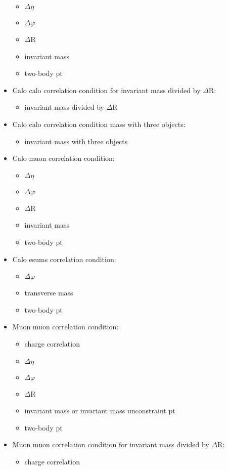 \begin{itemize}
\begin{itemize}
\item $\Delta\eta$
\item $\Delta\varphi$
\item $\Delta$R
\item invariant mass
\item two-body pt
\end{itemize}
\item Calo calo correlation condition for invariant mass divided by $\Delta$R:
\begin{itemize}
\item invariant mass divided by $\Delta$R
\end{itemize}
\item Calo calo correlation condition mass with three objects:
\begin{itemize}
\item invariant mass with three objects
\end{itemize}
\item Calo muon correlation condition:
\begin{itemize}
\item $\Delta\eta$
\item $\Delta\varphi$
\item $\Delta$R
\item invariant mass
\item two-body pt
\end{itemize}
\item Calo esums correlation condition:
\begin{itemize}
\item $\Delta\varphi$
\item transverse mass
\item two-body pt
\end{itemize}
\item Muon muon correlation condition:
\begin{itemize}
\item charge correlation
\item $\Delta\eta$
\item $\Delta\varphi$
\item $\Delta$R
\item invariant mass or invariant mass unconstraint pt
\item two-body pt
\end{itemize}
\item Muon muon correlation condition for invariant mass divided by $\Delta$R:
\begin{itemize}
\item charge correlation

\end{itemize}
\end{itemize}
